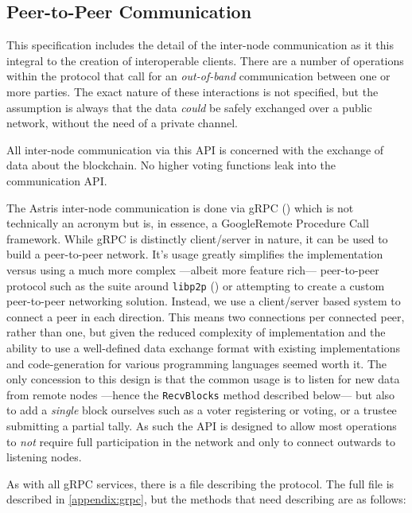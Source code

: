 \subsection{Peer-to-Peer Communication}
\label{ch:astris:detail:p2p}

This specification includes the detail of the inter-node communication as it this integral to the creation of interoperable clients. There are a number of operations within the protocol that call for an \emph{out-of-band} communication between one or more parties. The exact nature of these interactions is not specified, but the assumption is always that the data \emph{could} be safely exchanged over a public network, without the need of a private channel.

All inter-node communication via this API is concerned with the exchange of data about the blockchain. No higher voting functions leak into the communication API.

The Astris inter-node communication is done via gRPC () which is not technically an acronym but is, in essence, a Google\texttrademark Remote Procedure Call framework. While gRPC is distinctly client/server in nature, it can be used to build a peer-to-peer network. It's usage greatly simplifies the implementation versus using a much more complex ---albeit more feature rich--- peer-to-peer protocol such as the suite around \texttt{libp2p} () or attempting to create a custom peer-to-peer networking solution. Instead, we use a client/server based system to connect a peer in each direction. This means two connections per connected peer, rather than one, but given the reduced complexity of implementation and the ability to use a well-defined data exchange format with existing implementations and code-generation for various programming languages seemed worth it. The only concession to this design is that the common usage is to listen for new data from remote nodes ---hence the \texttt{RecvBlocks} method described below--- but also to add a \emph{single} block ourselves such as a voter registering or voting, or a trustee submitting a partial tally. As such the API is designed to allow most operations to \emph{not} require full participation in the network and only to connect outwards to listening nodes.

As with all gRPC services, there is a file describing the protocol. The full file is described in \autoref{appendix:grpc}, but the methods that need describing are as follows:

